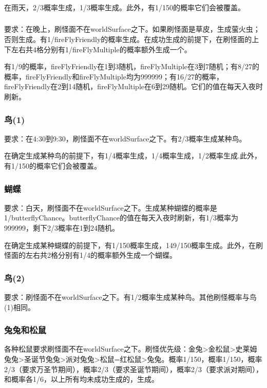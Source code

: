\subsubsection{}
在雨天，2/3概率生成，1/3概率生成。此外，有1/150的概率它们会被覆盖。

\subsubsection{}\label{app14}
要求：在晚上，刷怪面不在worldSurface之下。如果刷怪面是草皮，生成萤火虫；否则生成。有1/fireFlyFriendly的概率生成。在成功生成的前提下，在刷怪面的上下左右共4格分别有1/fireFlyMultiple的概率额外生成一个。

有1/9的概率，fireFlyFriendly在1到3随机，fireFlyMultiple在3到7随机；有8/27的概率，fireFlyFriendly和fireFlyMultiple均为999999；有16/27的概率，fireFlyFriendly在2到14随机，fireFlyMultiple在6到29随机。它们的值在每天入夜时刷新。

\subsubsection{鸟(1)}\label{app13}
要求：在4:30到9:30，刷怪面不在worldSurface之下。有2/3概率生成某种鸟。

在确定生成某种鸟的前提下，有1/4概率生成，1/4概率生成，1/2概率生成.此外，有1/150的概率它们会被覆盖。

\subsubsection{蝴蝶}\label{app11}
要求：白天，刷怪面不在worldSurface之下。生成某种蝴蝶的概率是1/butterflyChance。butterflyChance的值在每天入夜时刷新，有1/3概率为999999，剩下2/3概率在1到24随机。

在确定生成某种蝴蝶的前提下，有1/150概率生成，149/150概率生成。此外，在刷怪面的左右共2格分别有1/4的概率额外生成一个蝴蝶。

\subsubsection{鸟(2)}
要求：刷怪面不在worldSurface之下。有1/2概率生成某种鸟。其他刷怪概率与鸟(1)相同。

\subsubsection{兔兔和松鼠}\label{app12}
各种松鼠要求刷怪面不在worldSurface之下。刷怪优先级：金兔>金松鼠>史莱姆兔兔>圣诞节兔兔>派对兔兔>松鼠=红松鼠>兔兔。概率1/150，概率1/150，概率2/3（要求万圣节期间），概率2/3（要求圣诞节期间），概率2/3（要求派对期间），和概率各1/6，以上所有均未成功生成的，生成。

